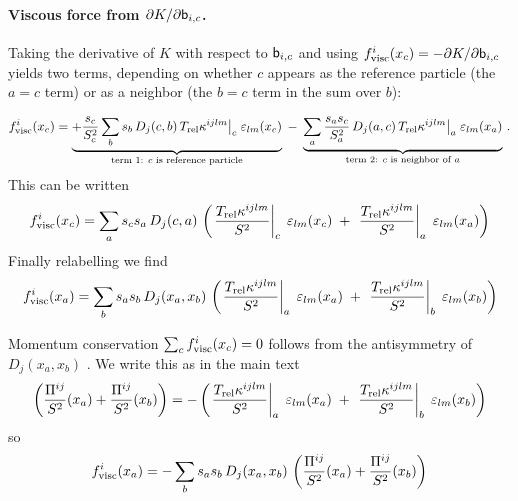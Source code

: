 \documentclass[12pt,aps,preprint,nofootinbib,noshowkeys,noshowpacs,longbibliography,superscriptaddress,tightenlines]{revtex4-2}
\def\bbeta{{\sf b}}
\begin{document}
\paragraph{Viscous force from $\partial K/\partial \bbeta_{i,c}$.}
Taking the derivative of $K$ with respect to $\bbeta_{i,c}$ and using
$f^i_{\rm visc}(x_c) = -\partial K/\partial\bbeta_{i,c}$ yields two terms,
depending on whether $c$ appears as the reference particle (the $a=c$
term) or as a neighbor (the $b=c$ term in the sum over $b$):

\begin{equation}
\label{eq:force_twolevel}
    f^i_{\rm visc}(x_c) =
    \underbrace{+\frac{s_c}{S_c^2}\sum_b s_b\,D_j(c,b)\,
    T_{\rm rel}\kappa^{ijlm}\big|_c\;\varepsilon_{lm}(x_c)}_{\text{term 1: }c\text{ is reference particle}}
    \;-\;
    \underbrace{\sum_a \frac{s_a s_c}{S_a^2}\,D_j(a,c)\,
    T_{\rm rel}\kappa^{ijlm}\big|_a\;\varepsilon_{lm}(x_a)}_{\text{term 2: }c\text{ is neighbor of }a}\,.
\end{equation}
This can be written
\begin{equation}
\label{eq:force_combined}
    f^i_{\rm visc}(x_c) =
     \sum_a s_c s_a \,D_j(c,a)\,
     \left( \left. \frac{T_{\rm rel}\kappa^{ijlm}}{S^2}\right|_c\;\varepsilon_{lm}(x_c)
    \;+\;
    \left. \frac{T_{\rm rel}\kappa^{ijlm}}{S^2}\right|_a\;\varepsilon_{lm}(x_a) \right)
\end{equation}
Finally relabelling we find
\begin{equation}
\label{eq:force_relabeled}
    f^i_{\rm visc}(x_a) =
     \sum_b
      s_a s_b \,D_j(x_a, x_b)\,
     \left( \left. \frac{T_{\rm rel}\kappa^{ijlm}}{S^2}\right|_a\;\varepsilon_{lm}(x_a)
    \;+\;
    \left. \frac{T_{\rm rel}\kappa^{ijlm}}{S^2}\right|_b\;\varepsilon_{lm}(x_b) \right)
\end{equation}

Momentum conservation $\sum_c f^i_{\rm visc}(x_c) = 0$ follows from the
antisymmetry of $D_j(x_a, x_b)$ . We write this as in the main text
\begin{equation}
   \left(\frac{\Pi^{ij}}{S^2}(x_a)  
   +
   \frac{\Pi^{ij}}{S^2}(x_b)  
   \right)
     =
     -\left( \left. \frac{T_{\rm rel}\kappa^{ijlm}}{S^2}\right|_a\;\varepsilon_{lm}(x_a)
    \;+\;
    \left. \frac{T_{\rm rel}\kappa^{ijlm}}{S^2}\right|_b\;\varepsilon_{lm}(x_b) \right)
\end{equation}
so
\begin{equation}
\label{eq:force_Pi}
    f^i_{\rm visc}(x_a) =
     -\sum_b s_a s_b \,D_j(x_a, x_b)\,
   \left(\frac{\Pi^{ij}}{S^2}(x_a)  
   +
   \frac{\Pi^{ij}}{S^2}(x_b)  
   \right)
\end{equation}
\end{document}
